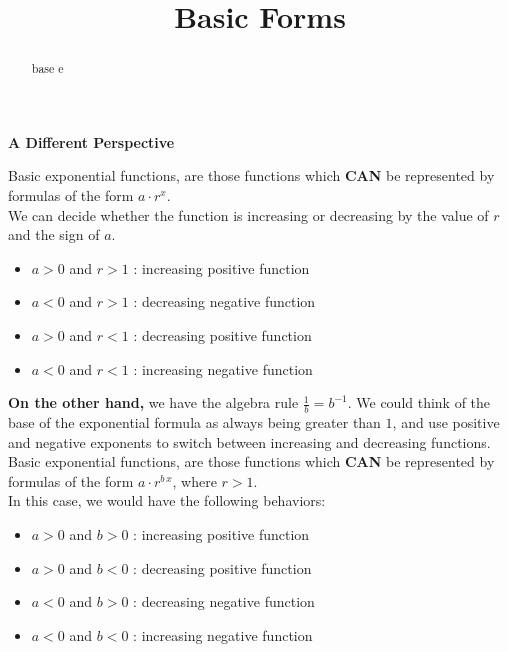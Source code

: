\documentclass{ximera}
\title{Basic Forms}
\begin{document}
\begin{abstract}
base e
\end{abstract}
\maketitle






\textbf{\textcolor{blue!55!black}{A Different Perspective}} 


Basic exponential functions, are those functions which \textbf{\textcolor{red!80!black}{CAN}} be represented by formulas of the form $a \cdot r^x$.  \\


We can decide whether the function is increasing or decreasing by the value of $r$ and the sign of $a$. \\



\begin{itemize}
\item $a > 0$ and $r > 1$ : increasing positive function
\item $a < 0$ and $r > 1$ : decreasing negative function  
\item $a > 0$ and $r < 1$ : decreasing positive function
\item $a < 0$ and $r < 1$ : increasing negative function  
\end{itemize}



\textbf{On the other hand,} we have the algebra rule $\frac{1}{b} = b^{-1}$.  We could think of the base of the exponential formula as always being greater than $1$, and use positive and negative exponents to switch between increasing and decreasing functions. \\


Basic exponential functions, are those functions which \textbf{\textcolor{red!80!black}{CAN}} be represented by formulas of the form $a \cdot r^{b \, x}$, where $r > 1$.  \\


In this case, we would have the following behaviors: \\


\begin{itemize}
\item $a > 0$ and $b > 0$ : increasing positive function
\item $a > 0$ and $b < 0$ : decreasing positive function
\item $a < 0$ and $b > 0$ : decreasing negative function  
\item $a < 0$ and $b < 0$ : increasing negative function  
\end{itemize}
\end{document}
